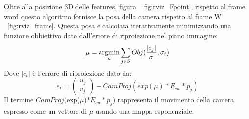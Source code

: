 Oltre alla posizione 3D delle features, figura ~\ref{fig:rviz_Fpoint}, rispetto al frame word questo algoritmo fornisce la posa della camera rispetto al frame W  ~\ref{fig:rviz_frame}. Questa posa è calcolata iterativamente minimizzando una funzione obbiettivo dato dall'errore di riproiezione nel piano immagine:
\begin{equation}
\mu = \operatorname*{argmin}_\mu {\sum_{j \in S} Obj(\frac{|e_j|}{\sigma},\sigma_t)}
\label{eq:funzione obbiettivo}
\end{equation}
Dove $|e_t|$ è l'errore di riproiezione dato da:
\begin{equation}
e_t =  \left(\begin{array}{c} u_j \\ v_j \end{array} \right) - CamProj(exp(\mu)*E_{cw}*p_j)
\label{eq:errore di riproiezione}
\end{equation}
Il termine $CamProj($exp($\mu$)$ *E_{cw}*p_j)$ rappresenta il movimento della camera espresso come un vettore di $\mu$ usando una mappa esponenziale. 
\begin{figure}
   \centering
    \\
\end{figure}  
